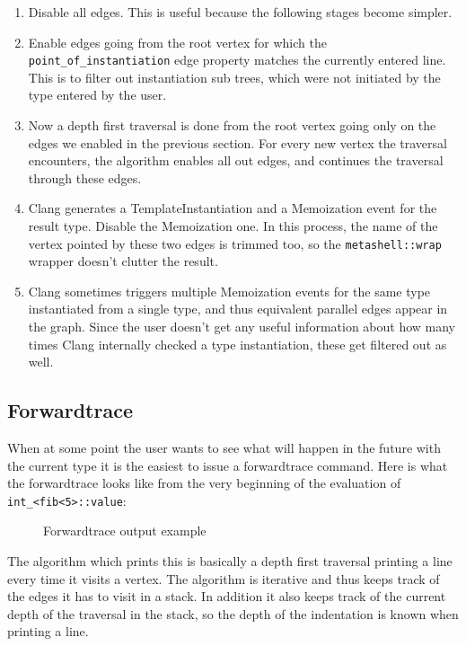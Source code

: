 \begin{enumerate}
    \item
        Disable all edges. This is useful because the following stages become
        simpler.
    \item
        Enable edges going from the root vertex for which the
        \texttt{point\_of\_instantiation} edge property matches the currently
        entered line. This is to filter out instantiation sub trees, which were
        not initiated by the type entered by the user.
    \item
        Now a depth first traversal is done from the root vertex going only on
        the edges we enabled in the previous section. For every new vertex the
        traversal encounters, the algorithm enables all out edges, and
        continues the traversal through these edges.
    \item
        Clang generates a TemplateInstantiation and a Memoization event for the
        result type. Disable the Memoization one. In this process, the name of
        the vertex pointed by these two edges is trimmed too, so the
        \texttt{metashell::wrap} wrapper doesn't clutter the result.
    \item
        Clang sometimes triggers multiple Memoization events for the same type
        instantiated from a single type, and thus equivalent parallel edges
        appear in the graph. Since the user doesn't get any useful information
        about how many times Clang internally checked a type instantiation,
        these get filtered out as well.
\end{enumerate}

\subsection{Forwardtrace}

When at some point the user wants to see what will happen in the future with
the current type it is the easiest to issue a forwardtrace command. Here is
what the forwardtrace looks like from the very beginning of the evaluation of
\texttt{int\_<fib<5>::value}:

\bigskip

\begin{figure}[H]
    
    \caption{Forwardtrace output example}
\end{figure}

\noindent
The algorithm which prints this is basically a depth first traversal printing
a line every time it visits a vertex. The algorithm is iterative and thus keeps
track of the edges it has to visit in a stack. In addition it also keeps track
of the current depth of the traversal in the stack, so the depth of the
indentation is known when printing a line.

